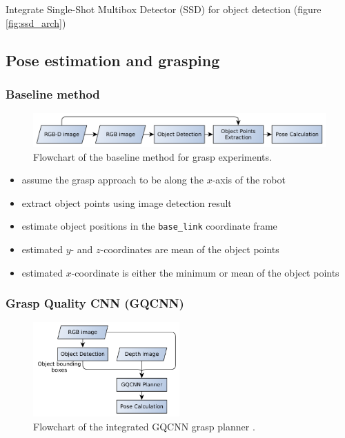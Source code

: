 \documentclass[runningheads]{../llncs}
\begin{document}
Integrate Single-Shot Multibox Detector (SSD) for object detection (figure \ref{fig:ssd_arch})

\subsection{Pose estimation and grasping}
\subsubsection*{Baseline method}
\begin{figure}[h!]
    \centering
    \includegraphics[width=\textwidth]{grasp_plan_pose_estimation}
    \caption{Flowchart of the baseline method for grasp experiments.}
    \label{fig:grasp_plan_baseline}
\end{figure}

\begin{itemize}
    \item assume the grasp approach to be along the $ x $-axis of the robot
    \item extract object points using image detection result
    \item estimate object positions in the \texttt{base\_link} coordinate frame
    \item estimated $ y $- and $ z $-coordinates are mean of the object points
    \item estimated $ x $-coordinate is either the minimum or mean of the object points
\end{itemize}

\subsubsection*{Grasp Quality CNN (GQCNN)}
\begin{figure}[h!]
    \centering
    \includegraphics[width=0.5\textwidth]{grasp_plan_gqcnn}
    \caption{Flowchart of the integrated GQCNN grasp planner \cite{mahler2017}.}
    \label{fig:grasp_plan_gqcnn}
\end{figure}
\end{document}
